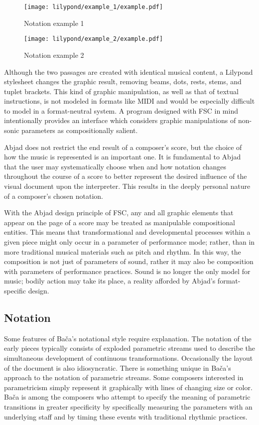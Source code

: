 \begin{figure}[H]
    \texttt{[image: lilypond/example\_1/example.pdf]}
    \caption{Notation example 1}
    \label{fig:tuplet}
\end{figure}

\begin{figure}[H]
    \texttt{[image: lilypond/example\_2/example.pdf]}
    \caption{Notation example 2}
    \label{fig:notuplets}
\end{figure}

Although the two passages are created with identical musical content, a Lilypond stylesheet changes the graphic result, removing beams, dots, rests, stems, and tuplet brackets. This kind of graphic manipulation, as well as that of textual instructions, is not modeled in formats like \ac{MIDI} and would be especially difficult to model in a format-neutral system. A program designed with \ac{FSC} in mind intentionally provides an interface which considers graphic manipulations of non-sonic parameters as compositionally salient.

Abjad does not restrict the end result of a composer’s score, but the choice of how the music is represented is an important one. It is fundamental to Abjad that the user may systematically choose when and how notation changes throughout the course of a score to better represent the desired influence of the visual document upon the interpreter. This results in the deeply personal nature of a composer’s chosen notation.

With the Abjad design principle of \ac{FSC}, any and all graphic elements that appear on the page of a score may be treated as manipulable compositional entities. This means that transformational and developmental processes within a given piece might only occur in a parameter of performance mode; rather, than in more traditional musical materials such as pitch and rhythm. In this way, the composition is not just of parameters of sound, rather it may also be composition with parameters of performance practices. Sound is no longer the only model for music; bodily action may take its place, a reality afforded by Abjad's format-specific design.

\subsection{Notation}

Some features of Ba\v{c}a's notational style require explanation. The notation of the early pieces typically consists of exploded parametric streams used to describe the simultaneous development of continuous transformations. Occasionally the layout of the document is also idiosyncratic. There is something unique in Ba\v{c}a's approach to the notation of parametric streams. Some composers interested in parametricism simply represent it graphically with lines of changing size or color. Ba\v{c}a is among the composers who attempt to specify the meaning of parametric transitions in greater specificity by specifically measuring the parameters with an underlying staff and by timing these events with traditional rhythmic practices.

